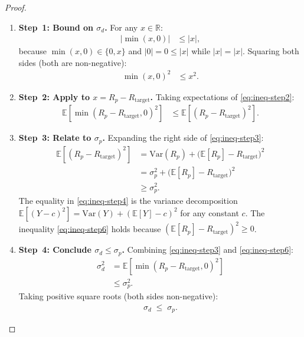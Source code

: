 \documentclass[12pt,openany]{book}
\newcommand{\E}{\mathbb{E}}
\numberwithin{equation}{chapter}
\theoremstyle{plain}
\theoremstyle{definition}
\theoremstyle{remark}
\numberwithin{equation}{chapter}
\theoremstyle{plain}
\begin{document}
\begin{proof}
\begin{enumerate}
  \item \textbf{Step~1: Bound on $\sigma_d$.}
        For any $x \in \mathbb{R}$:
        \begin{align}
          \bigl|\min(x, 0)\bigr|
            &\leq |x|,
          \label{eq:ineq-step1}
        \end{align}
        because $\min(x,0) \in \{0, x\}$ and $|0| = 0
        \leq |x|$ while $|x| = |x|$.  Squaring both sides
        (both are non-negative):
        \begin{align}
          \min(x,0)^{2}
            &\leq x^{2}.
          \label{eq:ineq-step2}
        \end{align}

  \item \textbf{Step~2: Apply to $x = R_p - R_{\mathrm{target}}$.}
        Taking expectations of \eqref{eq:ineq-step2}:
        \begin{align}
          \E\!\left[\min(R_p - R_{\mathrm{target}},0)^{2}\right]
            &\leq \E\!\left[(R_p - R_{\mathrm{target}})^{2}\right].
          \label{eq:ineq-step3}
        \end{align}

  \item \textbf{Step~3: Relate to $\sigma_p$.}
        Expanding the right side of \eqref{eq:ineq-step3}:
        \begin{align}
          \E\!\left[(R_p - R_{\mathrm{target}})^{2}\right]
            &= \mathrm{Var}(R_p)
               + \bigl(\E[R_p] - R_{\mathrm{target}}\bigr)^{2}
          \label{eq:ineq-step4} \\
            &= \sigma_p^{2}
               + \bigl(\E[R_p] - R_{\mathrm{target}}\bigr)^{2}
          \label{eq:ineq-step5} \\
            &\geq \sigma_p^{2}.
          \label{eq:ineq-step6}
        \end{align}
        The equality in \eqref{eq:ineq-step4} is the
        variance decomposition
        $\E[(Y - c)^{2}] = \mathrm{Var}(Y) + (\E[Y]-c)^{2}$
        for any constant $c$.  The inequality
        \eqref{eq:ineq-step6} holds because
        $(\E[R_p] - R_{\mathrm{target}})^{2} \geq 0$.

  \item \textbf{Step~4: Conclude $\sigma_d \leq \sigma_p$.}
        Combining \eqref{eq:ineq-step3} and
        \eqref{eq:ineq-step6}:
        \begin{align}
          \sigma_d^{2}
            &= \E\!\left[\min(R_p-R_{\mathrm{target}},0)^{2}
               \right]
          \label{eq:ineq-step7} \\
            &\leq \sigma_p^{2}.
          \label{eq:ineq-step8}
        \end{align}
        Taking positive square roots (both sides
        non-negative):
        \begin{align}
          \sigma_d \;\leq\; \sigma_p.
          \label{eq:ineq-step9}
        \end{align}


\end{enumerate}
\end{proof}
\end{document}
